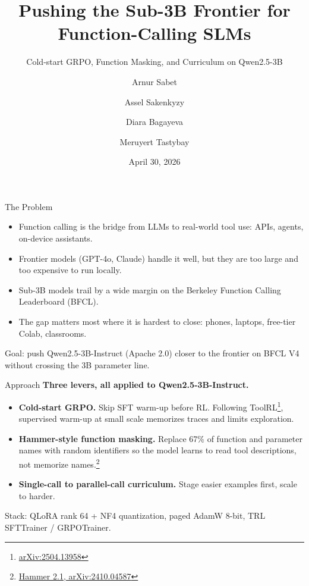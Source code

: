 \documentclass[aspectratio=169,11pt]{beamer}
\title{Pushing the Sub-3B Frontier for Function-Calling SLMs}
\subtitle{Cold-start GRPO, Function Masking, and Curriculum on Qwen2.5-3B}
\author{Arnur Sabet \and Assel Sakenkyzy \and Diara Bagayeva \and Meruyert Tastybay}
\institute{INFO 290: Fundamentals of Generative AI \\ UC Berkeley, Spring 2026}
\date{April 30, 2026}
\begin{document}
\begin{frame}
  \titlepage
\end{frame}

\begin{frame}{The Problem}
  \begin{itemize}
    \item Function calling is the bridge from LLMs to real-world tool use: APIs, agents, on-device assistants.
    \item Frontier models (GPT-4o, Claude) handle it well, but they are too large and too expensive to run locally.
    \item Sub-3B models trail by a wide margin on the Berkeley Function Calling Leaderboard (BFCL).
    \item The gap matters most where it is hardest to close: phones, laptops, free-tier Colab, classrooms.
  \end{itemize}
  \vspace{6pt}
  {\small\color{dimgray} Goal: push Qwen2.5-3B-Instruct (Apache 2.0) closer to the frontier on BFCL V4 without crossing the 3B parameter line.}
\end{frame}

\begin{frame}{Approach}
  \textbf{Three levers, all applied to Qwen2.5-3B-Instruct.}
  \begin{itemize}
    \item \textbf{Cold-start GRPO.} Skip SFT warm-up before RL. Following ToolRL\footnote{\href{https://arxiv.org/abs/2504.13958}{arXiv:2504.13958}}, supervised warm-up at small scale memorizes traces and limits exploration.
    \item \textbf{Hammer-style function masking.} Replace 67\% of function and parameter names with random identifiers so the model learns to read tool descriptions, not memorize names.\footnote{\href{https://arxiv.org/abs/2410.04587}{Hammer 2.1, arXiv:2410.04587}}
    \item \textbf{Single-call to parallel-call curriculum.} Stage easier examples first, scale to harder.
  \end{itemize}
  \vspace{4pt}
  {\small\color{dimgray} Stack: QLoRA rank 64 + NF4 quantization, paged AdamW 8-bit, TRL SFTTrainer / GRPOTrainer.}
\end{frame}
\end{document}
